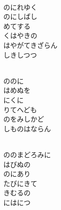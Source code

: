 \documentclass[10pt,b5j]{tarticle} %
\begin{document}
\vspace{1.5em} %
\newcommand{\linespace}{0.5em} %
\newcommand{\blocksize}{0.5\hsize} %
\newcommand{\itemmargin}{3em} %
\begin{enumerate} %
    \setlength{\itemindent}{\itemmargin} %
    \begin{minipage}[c]{\blocksize}
    
        \vspace{\linespace}
        \item~\\
        のにれゆく\\
        のにしばし\\
        めてする\\
        くはやきの\\
        はやがてきざらん\\
        しきしつつ
        
    \end{minipage}
    \begin{minipage}[c]{\blocksize}
        
        \vspace{\linespace}
        \item~\\
        ののに\\
        はめぬを\\
        にくに\\
        りてへども\\
        のをみしかど\\
        しものはならん
        
    \end{minipage}
    \begin{minipage}[c]{\blocksize}
        
        \vspace{\linespace}
        \item~\\
        ののまどろみに\\
        はびぬの\\
        のにあり\\
        たびにきて\\
        きむるの\\
        にはにつ
        

\end{minipage}
\end{enumerate}
\end{document}
